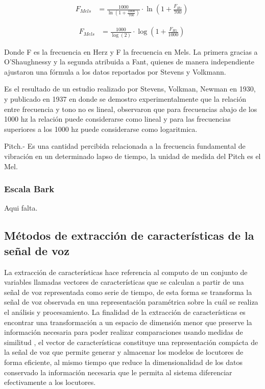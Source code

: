 \begin{align}
  F_{Mels} &= \frac{1000}{\ln(1 + \frac{1000}{700})} \cdot  \ln{\left(1 + \frac{F_{Hz}}{700}\right)}\
\end{align}

\begin{align}
  F_{Mels} &= \frac{1000}{\log(2)} \cdot \log{\left(1 + \frac{F_{Hz}}{1000}\right)}\
\end{align}

Donde F es la frecuencia en Herz y F la frecuencia en Mels. La primera gracias a O'Shaughnessy y la segunda atribuida a Fant, quienes de manera independiente ajustaron una fórmula a los datos reportados por Stevens y Volkmann.


Es el resultado de un estudio realizado por Stevens, Volkman, Newman en 1930, y publicado en 1937 en donde se demostro experimentalmente que la relación entre frecuencia y tono no es lineal, observaron que para frecuencias abajo de los 1000 hz la relación puede considerarse como lineal y para las frecuencias superiores a los 1000 hz  puede considerarse como logaritmica. 


Pitch.- Es una cantidad percibida relacionada a la frecuencia fundamental de vibración en un determinado lapso de tiempo, la unidad de medida del Pitch es el Mel.

\subsubsection{Escala Bark}

Aqui falta.\\

\subsection{M\'etodos de extracci\'on de caracter\'isticas de la señal de voz}

La extracci\'on de caracter\'isticas hace referencia al computo de un conjunto de variables llamadas vectores de caracter\'isticas que se calculan a partir de una señal de voz representada como serie de tiempo, de esta forma se transforma la señal de voz observada en una representaci\'on param\'etrica sobre la cu\'al se realiza el an\'alisis y procesamiento. La finalidad de la extracci\'on de caracter\'isticas es encontrar una transformaci\'on a un espacio de dimensi\'on menor que preserve la informaci\'on necesaria para poder realizar comparaciones usando medidas de similitud \cite{campbell1997}, el vector de caracter\'isticas constituye una representaci\'on comp\'acta de la señal de voz que permite generar y almacenar los modelos de locutores de forma eficiente, al mismo tiempo que reduce la dimensionalidad de los datos conservado la informaci\'on necesaria que le permita al sistema diferenciar efectivamente a los locutores.\\

